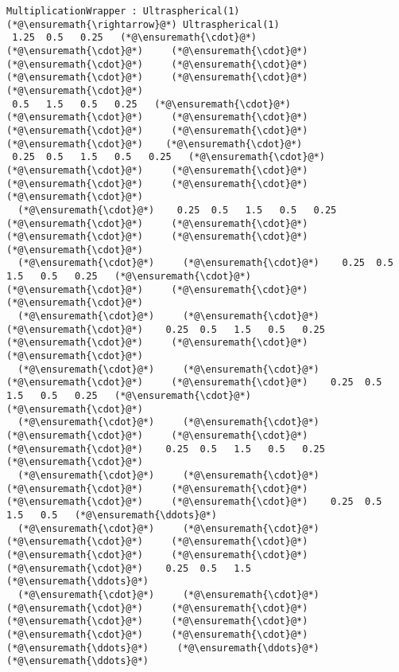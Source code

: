 \documentclass[12pt,a4paper]{article}
\begin{document}
\begin{lstlisting}
MultiplicationWrapper : Ultraspherical(1) (*@\ensuremath{\rightarrow}@*) Ultraspherical(1)
 1.25  0.5   0.25   (*@\ensuremath{\cdot}@*)     (*@\ensuremath{\cdot}@*)     (*@\ensuremath{\cdot}@*)     (*@\ensuremath{\cdot}@*)     (*@\ensuremath{\cdot}@*)     (*@\ensuremath{\cdot}@*)     (*@\ensuremath{\cdot}@*)    (*@\ensuremath{\cdot}@*)
 0.5   1.5   0.5   0.25   (*@\ensuremath{\cdot}@*)     (*@\ensuremath{\cdot}@*)     (*@\ensuremath{\cdot}@*)     (*@\ensuremath{\cdot}@*)     (*@\ensuremath{\cdot}@*)     (*@\ensuremath{\cdot}@*)    (*@\ensuremath{\cdot}@*)
 0.25  0.5   1.5   0.5   0.25   (*@\ensuremath{\cdot}@*)     (*@\ensuremath{\cdot}@*)     (*@\ensuremath{\cdot}@*)     (*@\ensuremath{\cdot}@*)     (*@\ensuremath{\cdot}@*)    (*@\ensuremath{\cdot}@*)
  (*@\ensuremath{\cdot}@*)    0.25  0.5   1.5   0.5   0.25   (*@\ensuremath{\cdot}@*)     (*@\ensuremath{\cdot}@*)     (*@\ensuremath{\cdot}@*)     (*@\ensuremath{\cdot}@*)    (*@\ensuremath{\cdot}@*)
  (*@\ensuremath{\cdot}@*)     (*@\ensuremath{\cdot}@*)    0.25  0.5   1.5   0.5   0.25   (*@\ensuremath{\cdot}@*)     (*@\ensuremath{\cdot}@*)     (*@\ensuremath{\cdot}@*)    (*@\ensuremath{\cdot}@*)
  (*@\ensuremath{\cdot}@*)     (*@\ensuremath{\cdot}@*)     (*@\ensuremath{\cdot}@*)    0.25  0.5   1.5   0.5   0.25   (*@\ensuremath{\cdot}@*)     (*@\ensuremath{\cdot}@*)    (*@\ensuremath{\cdot}@*)
  (*@\ensuremath{\cdot}@*)     (*@\ensuremath{\cdot}@*)     (*@\ensuremath{\cdot}@*)     (*@\ensuremath{\cdot}@*)    0.25  0.5   1.5   0.5   0.25   (*@\ensuremath{\cdot}@*)    (*@\ensuremath{\cdot}@*)
  (*@\ensuremath{\cdot}@*)     (*@\ensuremath{\cdot}@*)     (*@\ensuremath{\cdot}@*)     (*@\ensuremath{\cdot}@*)     (*@\ensuremath{\cdot}@*)    0.25  0.5   1.5   0.5   0.25  (*@\ensuremath{\cdot}@*)
  (*@\ensuremath{\cdot}@*)     (*@\ensuremath{\cdot}@*)     (*@\ensuremath{\cdot}@*)     (*@\ensuremath{\cdot}@*)     (*@\ensuremath{\cdot}@*)     (*@\ensuremath{\cdot}@*)    0.25  0.5   1.5   0.5   (*@\ensuremath{\ddots}@*)
  (*@\ensuremath{\cdot}@*)     (*@\ensuremath{\cdot}@*)     (*@\ensuremath{\cdot}@*)     (*@\ensuremath{\cdot}@*)     (*@\ensuremath{\cdot}@*)     (*@\ensuremath{\cdot}@*)     (*@\ensuremath{\cdot}@*)    0.25  0.5   1.5   (*@\ensuremath{\ddots}@*)
  (*@\ensuremath{\cdot}@*)     (*@\ensuremath{\cdot}@*)     (*@\ensuremath{\cdot}@*)     (*@\ensuremath{\cdot}@*)     (*@\ensuremath{\cdot}@*)     (*@\ensuremath{\cdot}@*)     (*@\ensuremath{\cdot}@*)     (*@\ensuremath{\cdot}@*)     (*@\ensuremath{\ddots}@*)     (*@\ensuremath{\ddots}@*)    (*@\ensuremath{\ddots}@*)
\end{lstlisting}
\end{document}
